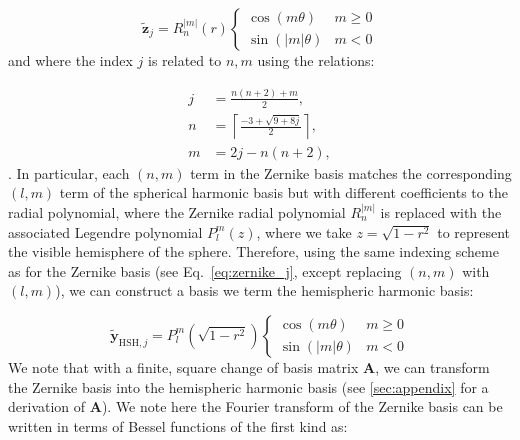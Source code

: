 \documentclass[modern]{aastex631}
\begin{document}
\begin{equation} \label{eq:zernike_j}
    \mathbf{\tilde{z}}_j = R_n^{|m|}(r) \left\{
    \begin{array}{ll}
    \cos(m \theta) &  m \geq 0 \\
    \sin(|m| \theta) &  m < 0
    \end{array}
    \right.
\end{equation}
and where the index $j$ is related to $n, m$ using the relations:

\begin{align} j & = \frac{{n(n + 2) + m}}{2}, \nonumber\\ n & = \left\lceil {\frac{{ - 3 + \sqrt {9 + 8j} }}{2}} \right\rceil , \nonumber\\ m & = 2j - n(n + 2),
\end{align}
\citep{niu2022}. In particular, each $(n, m)$ term in the Zernike basis matches the corresponding $(l, m)$ term of the spherical harmonic basis but with different coefficients to the radial polynomial, where the Zernike radial polynomial $R_n^{|m|}$ is replaced with the associated Legendre polynomial $P_l^{m}(z)$, where we take $z=\sqrt{1-r^2}$ to represent the visible hemisphere of the sphere. Therefore, using the same indexing scheme as for the Zernike basis (see Eq.~\ref{eq:zernike_j}, except replacing $(n, m)$ with $(l, m)$), we can construct a basis we term the hemispheric harmonic basis:

\begin{equation} \label{eq:hsh_basis}
\mathbf{\tilde{y}}_{\mathrm{HSH}, j} = P_l^m(\sqrt{1-r^2}) \left\{
    \begin{array}{ll}
    \cos(m \theta) &  m \geq 0 \\
    \sin(|m| \theta) &  m < 0
    \end{array}
    \right.
\end{equation}
We note that with a finite, square change of basis matrix $\mathbf{A}$, we can transform the Zernike basis into the hemispheric harmonic basis (see \ref{sec:appendix} for a derivation of $\mathbf{A}$). We note here the Fourier transform of the Zernike basis can be written in terms of Bessel functions of the first kind as: 
\end{document}
